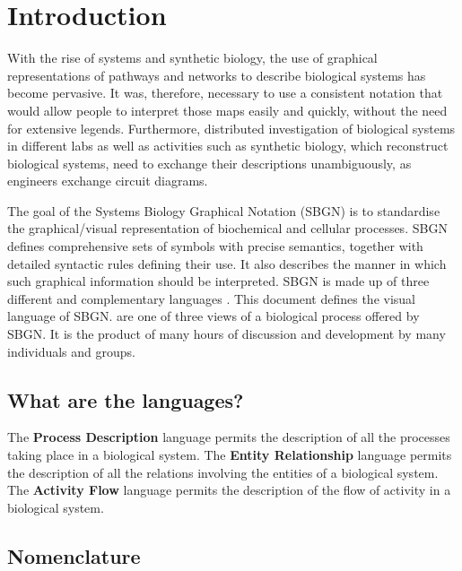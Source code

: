 \chapter{Introduction}

With the rise of systems and synthetic biology, the use of graphical representations
of pathways and networks to describe biological systems has become pervasive. 
It was, therefore, necessary to use a consistent notation that would allow people 
to interpret those maps easily and quickly, without the need for extensive legends.
Furthermore, distributed investigation of biological systems in different labs as well
as activities such as synthetic biology, which reconstruct biological systems, need
to exchange their descriptions unambiguously, as engineers exchange circuit diagrams.

The goal of the Systems Biology Graphical Notation (SBGN) is to standardise the 
graphical/visual representation of biochemical and cellular processes. SBGN 
defines comprehensive sets of symbols with precise semantics, together with 
detailed syntactic rules defining their use. It also describes the manner 
in which such graphical information should be interpreted.
SBGN is made up of three different and complementary languages \cite{Novere:2009p1}.
This document defines the \emph{\PD{}} visual language of SBGN. \PDs are 
one of three views of a biological process offered by SBGN. It is the 
product of many hours of discussion and development by many individuals and 
groups.

\section{What are the languages?}
\label{sec:what-languages}

The \textbf{Process Description} language permits the description of all the processes taking place in a biological system. 
The \textbf{Entity Relationship} language permits the description of all the relations involving the entities of a biological system.
The \textbf{Activity Flow} language permits the description of the flow of activity in a biological system.

\section{Nomenclature}
\label{sec:nomenclature}

